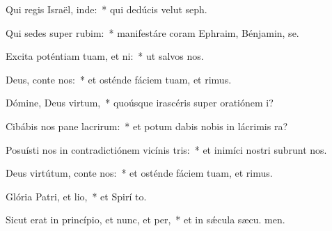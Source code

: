 \item Qui regis Israël, inde:~* qui dedúcis velut  seph.
\item Qui sedes super rubim:~* manifestáre coram Ephraim, Bénjamin,  se.
\item Excita poténtiam tuam, et ni:~* ut salvos  nos.
\item Deus, conte nos:~* et osténde fáciem tuam, et  rimus.
\item Dómine, Deus virtum,~* quoúsque irascéris super oratiónem  i?
\item Cibábis nos pane lacrirum:~* et potum dabis nobis in lácrimis  ra?
\item Posuísti nos in contradictiónem vicínis tris:~* et inimíci nostri subrunt nos.
\item Deus virtútum, conte nos:~* et osténde fáciem tuam, et  rimus.
\item Glória Patri, et lio,~* et Spirí to.
\item Sicut erat in princípio, et nunc, et per,~* et in sǽcula sæcu. men.
